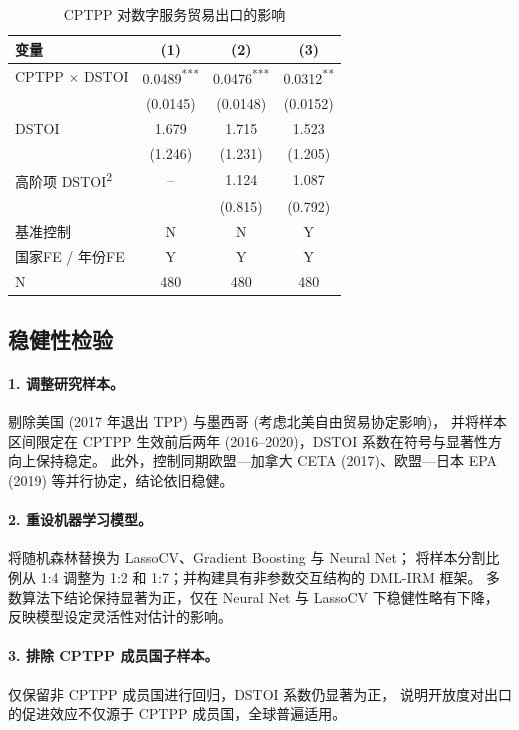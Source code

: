 \documentclass[11pt,a4paper]{article}
\begin{document}
\begin{table}[H]
\centering\small
\caption{CPTPP 对数字服务贸易出口的影响}\label{tab:cptpp}
\begin{tabular}{lccc}
\toprule
变量 & (1) & (2) & (3) \\
\midrule
CPTPP $\times$ DSTOI & 0.0489\textsuperscript{***} & 0.0476\textsuperscript{***} & 0.0312\textsuperscript{**} \\
                     & (0.0145) & (0.0148) & (0.0152) \\
DSTOI                & 1.679 & 1.715 & 1.523 \\
                     & (1.246) & (1.231) & (1.205) \\
高阶项 DSTOI\textsuperscript{2}  & --   & 1.124  & 1.087 \\
                                  &      & (0.815)& (0.792)\\
\midrule
基准控制         & N & N & Y \\
国家FE / 年份FE  & Y & Y & Y \\
N                & 480 & 480 & 480 \\
\bottomrule
\end{tabular}
\end{table}

\subsection{稳健性检验}

\paragraph{1. 调整研究样本。} 剔除美国 (2017 年退出 TPP) 与墨西哥 (考虑北美自由贸易协定影响)，
并将样本区间限定在 CPTPP 生效前后两年 (2016--2020)，DSTOI 系数在符号与显著性方向上保持稳定。
此外，控制同期欧盟—加拿大 CETA (2017)、欧盟—日本 EPA (2019) 等并行协定，结论依旧稳健。

\paragraph{2. 重设机器学习模型。} 将随机森林替换为 LassoCV、Gradient Boosting 与 Neural Net；
将样本分割比例从 1:4 调整为 1:2 和 1:7；并构建具有非参数交互结构的 DML-IRM 框架。
多数算法下结论保持显著为正，仅在 Neural Net 与 LassoCV 下稳健性略有下降，反映模型设定灵活性对估计的影响。

\paragraph{3. 排除 CPTPP 成员国子样本。} 仅保留非 CPTPP 成员国进行回归，DSTOI 系数仍显著为正，
说明开放度对出口的促进效应不仅源于 CPTPP 成员国，全球普遍适用。
\end{document}
